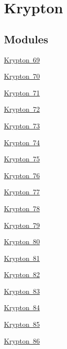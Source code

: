 \hypertarget{group___isotope_const-_krypton}{}\section{Krypton}
\label{group___isotope_const-_krypton}
\subsection*{Modules}
\begin{DoxyCompactItemize}
\item 
\mbox{\hyperlink{group___isotope_const-_krypton-_kr69}{Krypton 69}}
\item 
\mbox{\hyperlink{group___isotope_const-_krypton-_kr70}{Krypton 70}}
\item 
\mbox{\hyperlink{group___isotope_const-_krypton-_kr71}{Krypton 71}}
\item 
\mbox{\hyperlink{group___isotope_const-_krypton-_kr72}{Krypton 72}}
\item 
\mbox{\hyperlink{group___isotope_const-_krypton-_kr73}{Krypton 73}}
\item 
\mbox{\hyperlink{group___isotope_const-_krypton-_kr74}{Krypton 74}}
\item 
\mbox{\hyperlink{group___isotope_const-_krypton-_kr75}{Krypton 75}}
\item 
\mbox{\hyperlink{group___isotope_const-_krypton-_kr76}{Krypton 76}}
\item 
\mbox{\hyperlink{group___isotope_const-_krypton-_kr77}{Krypton 77}}
\item 
\mbox{\hyperlink{group___isotope_const-_krypton-_kr78}{Krypton 78}}
\item 
\mbox{\hyperlink{group___isotope_const-_krypton-_kr79}{Krypton 79}}
\item 
\mbox{\hyperlink{group___isotope_const-_krypton-_kr80}{Krypton 80}}
\item 
\mbox{\hyperlink{group___isotope_const-_krypton-_kr81}{Krypton 81}}
\item 
\mbox{\hyperlink{group___isotope_const-_krypton-_kr82}{Krypton 82}}
\item 
\mbox{\hyperlink{group___isotope_const-_krypton-_kr83}{Krypton 83}}
\item 
\mbox{\hyperlink{group___isotope_const-_krypton-_kr84}{Krypton 84}}
\item 
\mbox{\hyperlink{group___isotope_const-_krypton-_kr85}{Krypton 85}}
\item 
\mbox{\hyperlink{group___isotope_const-_krypton-_kr86}{Krypton 86}}

\end{DoxyCompactItemize}
